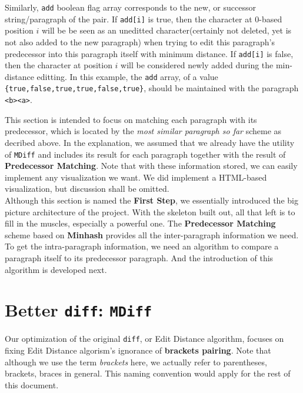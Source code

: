 \documentclass{article}
\begin{document}
\begin{enumerate}
\begin{itemize}
\begin{itemize}
      Similarly, \texttt{add} boolean flag array corresponds to the new, or successor string/paragraph of the pair. If \texttt{add[i]} is true, then the character at 0-based position $i$ will be be seen as an uneditted character(certainly not deleted, yet is not also added to the new paragraph) when trying to edit this paragraph's predecessor into this paragraph itself with minimum distance. If \texttt{add[i]} is false, then the character at position $i$ will be considered newly added during the min-distance editting. In this example, the \texttt{add} array, of a value \texttt{\{true,false,true,true,false,true\}}, should be maintained with the paragraph \texttt{<b><a>}.
    \end{itemize}
  \end{itemize}
\end{enumerate}

This section is intended to focus on matching each paragraph with its predecessor, which is located by the \textit{most similar paragraph so far} scheme as decribed above. In the explanation, we assumed that we already have the utility of \texttt{MDiff} and includes its result for each paragraph together with the result of \textbf{Predecessor Matching}. Note that with these information stored, we can easily implement any visualization we want. We did implement a HTML-based visualization, but discussion shall be omitted. \\

Although this section is named the \textbf{First Step}, we essentially introduced the big picture architecture of the project. With the skeleton built out, all that left is to fill in the muscles, especially a powerful one. The \textbf{Predecessor Matching} scheme based on \textbf{Minhash} provides all the inter-paragraph information we need. To get the intra-paragraph information, we need an algorithm to compare a paragraph itself to its predecessor paragraph. And the introduction of this algorithm is developed next.

\section{Better \texttt{diff}: \texttt{MDiff}}
Our optimization of the original \texttt{diff}, or Edit Distance algorithm, focuses on fixing Edit Distance algorism's ignorance of \textbf{brackets pairing}. Note that although we use the term \textit{brackets} here, we actually refer to parentheses, brackets, braces in general. This naming convention would apply for the rest of this document. \\
\end{document}
